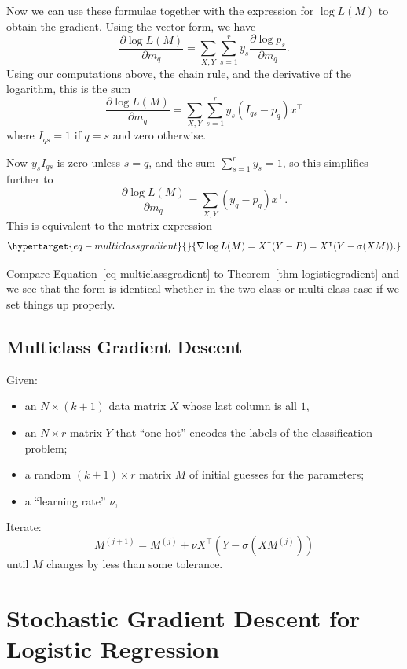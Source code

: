 \documentclass[
  11pt,
  letterpaper,
]{scrbook}
\providecommand{\tightlist}{%
  \setlength{\itemsep}{0pt}\setlength{\parskip}{0pt}}\usepackage{longtable,booktabs,array}
\theoremstyle{plain}
\theoremstyle{remark}
\begin{document}
Now we can use these formulae together with the expression for
\(\log L(M)\) to obtain the gradient. Using the vector form, we have \[
\frac{\partial \log L(M)}{\partial m_{q}} = \sum_{X,Y}\sum_{s=1}^{r} y_{s}\frac{\partial \log p_{s}}{\partial m_{q}}.
\] Using our computations above, the chain rule, and the derivative of
the logarithm, this is the sum \[
\frac{\partial \log L(M)}{\partial m_{q}} =\sum_{X,Y}\sum_{s=1}^{r} y_{s}(I_{qs}-p_{q})x^{\intercal}
\] where \(I_{qs}=1\) if \(q=s\) and zero otherwise.

Now \(y_{s}I_{qs}\) is zero unless \(s=q\), and the sum
\(\sum_{s=1}^{r} y_{s}=1\), so this simplifies further to \[
\frac{\partial \log L(M)}{\partial m_{q}} = \sum_{X,Y} (y_{q}-p_{q})x^{\intercal}.
\] This is equivalent to the matrix expression
\begin{equation}\protect\hypertarget{eq-multiclassgradient}{}{
\nabla \log L(M) = X^{\intercal}(Y-P)=X^{\intercal}(Y-\sigma(XM)).
}\label{eq-multiclassgradient}\end{equation}

Compare Equation~\ref{eq-multiclassgradient} to
Theorem~\ref{thm-logisticgradient} and we see that the form is identical
whether in the two-class or multi-class case if we set things up
properly.

\hypertarget{alg-graddescent}{}
\hypertarget{multiclass-gradient-descent}{%
\subsection{Multiclass Gradient
Descent}\label{multiclass-gradient-descent}}

Given:

\begin{itemize}
\tightlist
\item
  an \(N\times(k+1)\) data matrix \(X\) whose last column is all \(1\),
\item
  an \(N\times r\) matrix \(Y\) that ``one-hot'' encodes the labels of
  the classification problem;
\item
  a random \((k+1)\times r\) matrix \(M\) of initial guesses for the
  parameters;
\item
  a ``learning rate'' \(\nu\),
\end{itemize}

Iterate: \[
M^{(j+1)}=M^{(j)}+\nu X^{\intercal}(Y-\sigma(XM^{(j)}))
\] until \(M\) changes by less than some tolerance.

\hypertarget{stochastic-gradient-descent-for-logistic-regression}{%
\section{Stochastic Gradient Descent for Logistic
Regression}\label{stochastic-gradient-descent-for-logistic-regression}}
\end{document}
